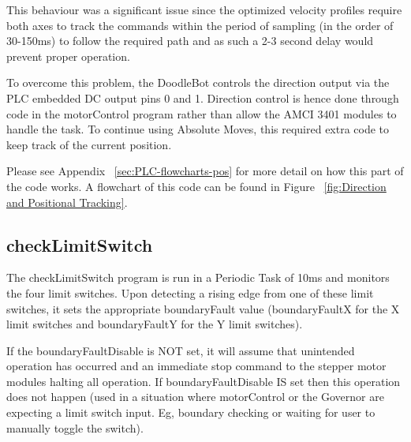 			This behaviour was a significant issue since the optimized velocity profiles require both axes to track the commands within the period of sampling (in the order of 30-150ms) to follow the required path and as such a 2-3 second delay would prevent proper operation.
			
			To overcome this problem, the DoodleBot controls the direction output via the PLC embedded DC output pins 0 and 1. Direction control is hence done  through code in the motorControl program rather than allow the AMCI 3401 modules to handle the task. To continue using Absolute Moves, this required extra code to keep track of the current position.
			
			Please see Appendix ~\ref{sec:PLC-flowcharts-pos} for more detail on how this part of the code works. A flowchart of this code can be found in Figure ~\ref{fig:Direction and Positional Tracking}.
			

\subsection{checkLimitSwitch}
	The checkLimitSwitch program is run in a Periodic Task of 10ms and monitors the four limit switches. Upon detecting a rising edge from one of these limit switches, it sets the appropriate boundaryFault value (boundaryFaultX for the X limit switches and boundaryFaultY for the Y limit switches).
	
	If the boundaryFaultDisable is NOT set, it will assume that unintended operation has occurred and an immediate stop command to the stepper motor modules halting all operation. If boundaryFaultDisable IS set then this operation does not happen (used in a situation where motorControl or the Governor are expecting a limit switch input. Eg, boundary checking or waiting for user to manually toggle the switch).